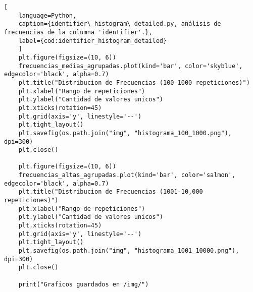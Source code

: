 \begin{lstlisting}[
    language=Python,
    caption={identifier\_histogram\_detailed.py, análisis de frecuencias de la columna 'identifier'.},
    label={cod:identifier_histogram_detailed}
    ]
    plt.figure(figsize=(10, 6))
    frecuencias_medias_agrupadas.plot(kind='bar', color='skyblue', edgecolor='black', alpha=0.7)
    plt.title("Distribucion de Frecuencias (100-1000 repeticiones)")
    plt.xlabel("Rango de repeticiones")
    plt.ylabel("Cantidad de valores unicos")
    plt.xticks(rotation=45)
    plt.grid(axis='y', linestyle='--')
    plt.tight_layout()
    plt.savefig(os.path.join("img", "histograma_100_1000.png"), dpi=300)
    plt.close()

    plt.figure(figsize=(10, 6))
    frecuencias_altas_agrupadas.plot(kind='bar', color='salmon', edgecolor='black', alpha=0.7)
    plt.title("Distribucion de Frecuencias (1001-10,000 repeticiones)")
    plt.xlabel("Rango de repeticiones")
    plt.ylabel("Cantidad de valores unicos")
    plt.xticks(rotation=45)
    plt.grid(axis='y', linestyle='--')
    plt.tight_layout()
    plt.savefig(os.path.join("img", "histograma_1001_10000.png"), dpi=300)
    plt.close()

    print("Graficos guardados en /img/")
\end{lstlisting}
\vfill